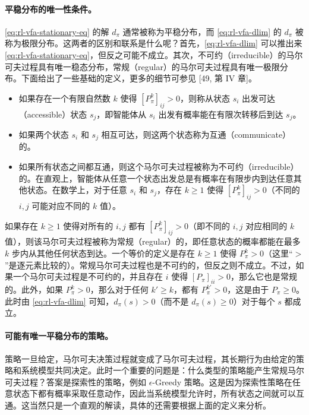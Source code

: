 \begin{note}[方框 8.1：马尔可夫决策过程的平稳分布]
\paragraph{平稳分布的唯一性条件。}\cref{eq:rl-vfa-stationary-eq} 的解 $d_{\pi}$ 通常被称为平稳分布，而 \cref{eq:rl-vfa-dlim} 的 $d_{\pi}$ 被称为极限分布。这两者的区别和联系是什么呢？首先，\cref{eq:rl-vfa-dlim} 可以推出来 \cref{eq:rl-vfa-stationary-eq}，但反之可能不成立。其次，不可约（irreducible）的马尔可夫过程具有唯一稳态分布，常规（regular）的马尔可夫过程具有唯一极限分布。下面给出了一些基础的定义，更多的细节可参见 [49, 第 IV 章]。
\begin{itemize}
  \item 如果存在一个有限自然数 $k$ 使得 $[P_{\pi}^{k}]_{ij} > 0$，则称从状态 $s_i$ 出发可达（accessible）状态 $s_j$，即智能体从 $s_i$ 出发有概率能在有限次转移后到达 $s_j$。
  \item 如果两个状态 $s_i$ 和 $s_j$ 相互可达，则这两个状态称为互通（communicate）的。
  \item 如果所有状态之间都互通，则这个马尔可夫过程被称为不可约（irreducible）的。在直观上，智能体从任意一个状态出发总是有概率在有限步内到达任意其他状态。在数学上，对于任意 $s_i$ 和 $s_j$，存在 $k \geqslant 1$ 使得 $[P_{\pi}^{k}]_{ij} > 0$（不同的 $i, j$ 可能对应不同的 $k$ 值）。
\end{itemize}

如果存在 $k \geqslant 1$ 使得对所有的 $i, j$ 都有 $[P_{\pi}^{k}]_{ij} > 0$（即不同的 $i, j$ 对应相同的 $k$ 值），则该马尔可夫过程被称为常规（regular）的，即任意状态的概率都能在最多 $k$ 步内从其他任何状态到达。一个等价的定义是存在 $k \geqslant 1$ 使得 $P_{\pi}^{k} > 0$（这里“$>$”是逐元素比较的）。常规马尔可夫过程也是不可约的，但反之则不成立。不过，如果一个马尔可夫过程是不可约的，并且存在 $i$ 使得 $[P_{\pi}]_{ii} > 0$，那么它也是常规的。此外，如果 $P_{\pi}^{k} > 0$，那么对于任何 $k' \geqslant k$，都有 $P_{\pi}^{k'} > 0$，这是由于 $P_{\pi} \geqslant 0$。此时由 \cref{eq:rl-vfa-dlim} 可知，$d_{\pi}(s) > 0$（而不是 $d_{\pi}(s) \geqslant 0$）对于每个 $s$ 都成立。

\paragraph{可能有唯一平稳分布的策略。}策略一旦给定，马尔可夫决策过程就变成了马尔可夫过程，其长期行为由给定的策略和系统模型共同决定。此时一个重要的问题是：什么类型的策略能产生常规马尔可夫过程？答案是探索性的策略，例如 $\epsilon$-Greedy 策略。这是因为探索性策略在任意状态下都有概率采取任意动作，因此当系统模型允许时，所有状态之间就可以互通。这当然只是一个直观的解读，具体的还需要根据上面的定义来分析。


\end{note}
